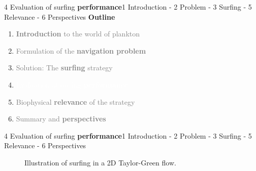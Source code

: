 
\begin{frame}{4 Evaluation of surfing \textbf{performance}}{1 Introduction - 2 Problem - 3 Surfing - 5 Relevance - 6 Perspectives}
	\centering
	\vspace{15pt}
	\textbf{\Large Outline}

	\vspace{15pt}

	\large
	\begin{enumerate}
		\setlength\itemsep{10pt}
		\item \textcolor{gray}{\textbf{Introduction} to the world of plankton}
		\item \textcolor{gray}{Formulation of the \textbf{navigation problem}}
		\item \textcolor{gray}{Solution: The \textbf{surfing} strategy}
		\item \textcolor{white}{Evaluation of surfing \textbf{performance}}
		\item \textcolor{gray}{Biophysical \textbf{relevance} of the strategy}
		\item \textcolor{gray}{Summary and \textbf{perspectives}}
	\end{enumerate}

\end{frame}


\begin{frame}{4 Evaluation of surfing \textbf{performance}}{1 Introduction - 2 Problem - 3 Surfing - 5 Relevance - 6 Perspectives}
	\centering
	\vspace{0pt}
	\begin{figure}
		\caption{
			Illustration of surfing in a 2D Taylor-Green flow.
		}
	\end{figure}
\end{frame}

